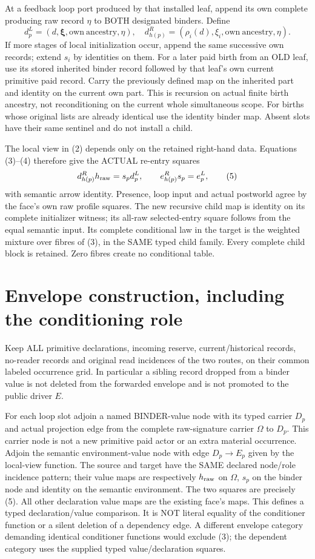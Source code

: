 \documentclass[11pt]{article}
\begin{document}
At a feedback loop port produced by that installed leaf, append its own complete producing raw record $\eta$ to BOTH designated binders. Define
\[
 d^L_p=(d,\boldsymbol\xi,\mathrm{own\ ancestry},\eta),
 \quad d^R_{h(p)}=(\rho_i(d),\xi_i,\mathrm{own\ ancestry},\eta).
                                                               \tag{4}
\]
If more stages of local initialization occur, append the same successive own records; extend $s_i$ by identities on them. For a later paid birth from an OLD leaf, use its stored inherited binder record followed by that leaf's own current primitive paid record. Carry the previously defined map on the inherited part and identity on the current own part. This is recursion on actual finite birth ancestry, not reconditioning on the current whole simultaneous scope. For births whose original lists are already identical use the identity binder map. Absent slots have their same sentinel and do not install a child.

The local view in (2) depends only on the retained right-hand data. Equations (3)--(4) therefore give the ACTUAL re-entry squares
\[
       d^R_{h(p)}h_{\rm raw}=s_pd^L_p,
       \qquad e^R_{h(p)}s_p=e^L_p,                       \tag{5}
\]
with semantic arrow identity. Presence, loop input and actual postworld agree by the face's own raw profile squares. The new recursive child map is identity on its complete initializer witness; its all-raw selected-entry square follows from the equal semantic input. Its complete conditional law in the target is the weighted mixture over fibres of (3), in the SAME typed child family. Every complete child block is retained. Zero fibres create no conditional table.

\section{Envelope construction, including the conditioning role}
Keep ALL primitive declarations, incoming reserve, current/historical records, no-reader records and original read incidences of the two routes, on their common labeled occurrence grid. In particular a sibling record dropped from a binder value is not deleted from the forwarded envelope and is not promoted to the public driver $E$.

For each loop slot adjoin a named BINDER-value node with its typed carrier $D_p$ and actual projection edge from the complete raw-signature carrier $\Omega$ to $D_p$. This carrier node is not a new primitive paid actor or an extra material occurrence. Adjoin the semantic environment-value node with edge $D_p\to E_p$ given by the local-view function. The source and target have the SAME declared node/role incidence pattern; their value maps are respectively $h_{\rm raw}$ on $\Omega$, $s_p$ on the binder node and identity on the semantic environment. The two squares are precisely (5). All other declaration value maps are the existing face's maps. This defines a typed declaration/value comparison. It is NOT literal equality of the conditioner function or a silent deletion of a dependency edge. A different envelope category demanding identical conditioner functions would exclude (3); the dependent category uses the supplied typed value/declaration squares.
\end{document}
